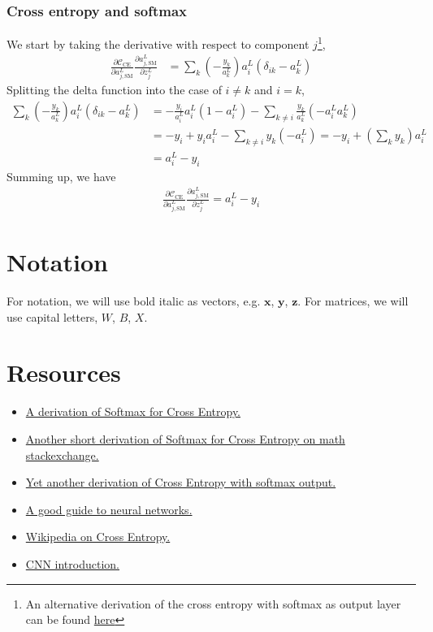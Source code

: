 \documentclass[a4paper,10pt]{article}
\newcommand{\pd}[2]{\frac{\partial {#1}}{\partial {#2}}}
\begin{document}
\subsubsection{Cross entropy and softmax}
We start by taking the derivative with respect to component $j$\footnote{An alternative derivation of the cross entropy with softmax as output layer can be found \href{https://math.stackexchange.com/questions/945871/derivative-of-softmax-loss-function}{here}},
\begin{align*}
    \pd{\mathcal{C}_\mathrm{CE}}{a^L_{j,\mathrm{SM}}} \pd{a^L_{j,\mathrm{SM}}}{z^L_j} &= \sum_k \left( -\frac{y_k}{a^L_k} \right)a_i^L \left( \delta_{ik} - a_k^L \right)
\end{align*}
Splitting the delta function into the case of $i\neq k$ and $i=k$,
\begin{align*}
    \sum_k \left( -\frac{y_k}{a^L_k} \right)a_i^L \left( \delta_{ik} - a_k^L \right) &= -\frac{y_i}{a_i^L}a^L_i \left( 1 - a_i^L \right) - \sum_{k\neq i} \frac{y_k}{a^L_k} \left( -a_i^L a_k^L \right) \\
    &= -y_i + y_i a^L_i - \sum_{k\neq i} y_k (-a_i^L) = -y_i + \left(\sum_k y_k \right) a^L_i \\
    &= a_i^L - y_i
\end{align*}
Summing up, we have
\begin{align}
    \pd{\mathcal{C}_\mathrm{CE}}{a^L_{j,\mathrm{SM}}} \pd{a^L_{j,\mathrm{SM}}}{z^L_j} = a_i^L - y_i
    \label{eq:cross-entropy-softmax-derivative}
\end{align}

\begin{appendices}
\section{Notation} \label{app:notation}
For notation, we will use bold italic as vectors, e.g. $\bm{x}$, $\bm{y}$, $\bm{z}$. For matrices, we will use capital letters, $W$, $B$, $X$.

\section{Resources}
\begin{itemize}
    \item \href{https://eli.thegreenplace.net/2016/the-softmax-function-and-its-derivative/}{A derivation of Softmax for Cross Entropy.}
    \item \href{https://math.stackexchange.com/questions/945871/derivative-of-softmax-loss-function}{Another short derivation of Softmax for Cross Entropy on math stackexchange.}
    \item \href{https://deepnotes.io/softmax-crossentropy}{Yet another derivation of Cross Entropy with softmax output.}
    \item \href{http://neuralnetworksanddeeplearning.com/chap2.html}{A good guide to neural networks.}
    \item \href{https://en.wikipedia.org/wiki/Cross_entropy}{Wikipedia on Cross Entropy.}
    \item \href{http://colah.github.io/posts/2014-07-Understanding-Convolutions/}{CNN introduction.}
\end{itemize}
\end{appendices}
\end{document}
